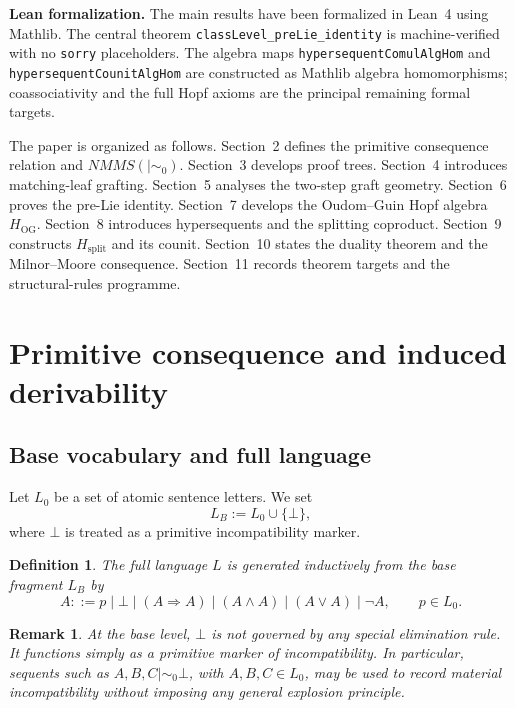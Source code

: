 \documentclass[11pt]{article}
\newtheorem{definition}[theorem]{Definition}
\newtheorem{remark}[theorem]{Remark}
\newcommand{\mszero}{\mathrel{\mid\!\sim_{0}}}
\newcommand{\NMMS}{\mathit{NMMS}}
\begin{document}
\medskip

\noindent\textbf{Lean formalization.}
The main results have been formalized in Lean~4 using Mathlib.
The central theorem \texttt{classLevel\_preLie\_identity} is machine-verified with no \texttt{sorry} placeholders. The algebra maps \texttt{hypersequentComulAlgHom} and \texttt{hypersequentCounitAlgHom} are constructed as Mathlib algebra homomorphisms; coassociativity and the full Hopf axioms are the principal remaining formal targets.

\medskip

The paper is organized as follows. Section~2 defines the primitive consequence
relation and $\NMMS(\mszero)$. Section~3 develops proof trees. Section~4 introduces matching-leaf grafting. Section~5 analyses the two-step graft geometry. Section~6 proves the pre-Lie identity. Section~7 develops the Oudom--Guin Hopf algebra $H_{\mathrm{OG}}$. Section~8 introduces hypersequents and the splitting coproduct. Section~9 constructs $H_{\mathrm{split}}$ and its counit. Section~10 states the duality theorem and the Milnor--Moore consequence. Section~11 records theorem targets and the structural-rules programme.

\section{Primitive consequence and induced derivability}

\subsection{Base vocabulary and full language}

Let \(L_0\) be a set of atomic sentence letters. We set
\[
L_B := L_0 \cup \{\bot\},
\]
where \(\bot\) is treated as a primitive incompatibility marker.

\begin{definition}
The full language \(L\) is generated inductively from the base fragment
\(L_B\) by
\[
A ::= p \mid \bot \mid (A\Rightarrow A)\mid (A\wedge A)\mid (A\vee A)\mid \neg A,
\qquad p\in L_0.
\]
\end{definition}

\begin{remark}
At the base level, \(\bot\) is not governed by any special elimination rule.
It functions simply as a primitive marker of incompatibility. In particular,
sequents such as \(A,B,C \mszero \bot\), with \(A,B,C\in L_0\), may be used to
record material incompatibility without imposing any general explosion
principle.
\end{remark}
\end{document}
